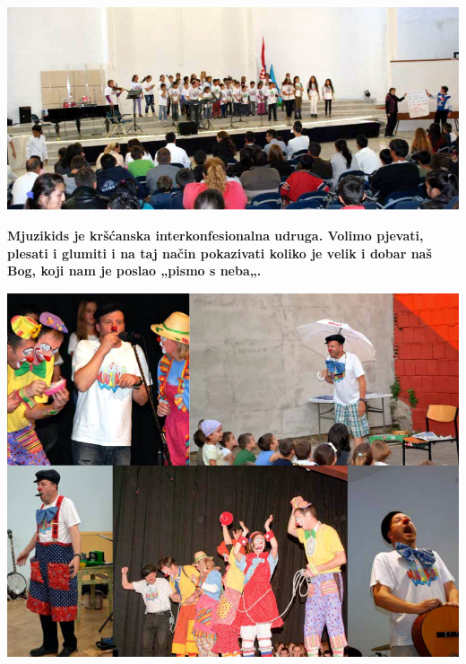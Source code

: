 \documentclass[a4paper,twoside, svgnames]{article}
\begin{document}
\newpage
\begin{center}
\includegraphics[width=\linewidth]{images/pastorlani}\\

\vfill

\textbf{Mjuzikids je kršćanska interkonfesionalna udruga.
Volimo pjevati, plesati i glumiti i na taj način pokazivati koliko je velik
i dobar naš Bog, koji nam je poslao „pismo s neba„.}

\vfill
\includegraphics[width=\linewidth]{images/klauni}\\

\end{center}
\end{document}
